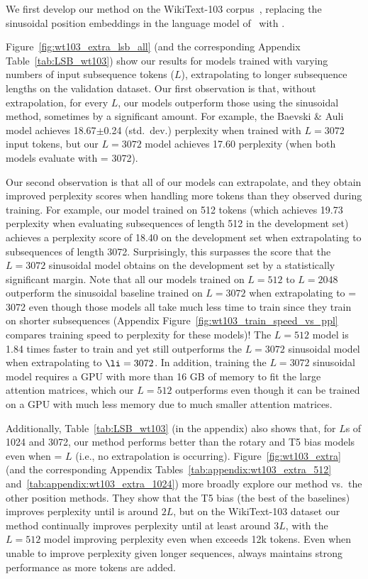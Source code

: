 We first develop our method on the WikiText-103 corpus~\citep{pointer}, replacing the sinusoidal position embeddings in the language model of~\cite{baevski} with \al. 

Figure~\ref{fig:wt103_extra_lsb_all} (and the corresponding Appendix Table~\ref{tab:LSB_wt103}) show our results for models trained with varying numbers of input subsequence tokens ($L$), extrapolating to longer subsequence lengths on the validation dataset. 
Our first observation is that, without extrapolation, for every $L$, our models outperform  those using the sinusoidal method, sometimes by a  significant %
amount. For example, the Baevski \& Auli model achieves 18.67$\pm$0.24 (std.~dev.) perplexity when trained with $L = 3072$ input tokens, but our $L=3072$ model achieves 17.60 perplexity (when both models evaluate with \li = 3072).

Our second observation is that all of our models can extrapolate, and they obtain improved perplexity scores when handling more tokens than they observed during training. For example, our model trained on 512 tokens (which achieves 19.73 perplexity when evaluating subsequences of length 512 in the development set) achieves a perplexity score of 18.40 on the development set when extrapolating to subsequences of length 3072. Surprisingly, this surpasses the score that the $L=3072$ sinusoidal model obtains on the development set by a statistically significant margin. 
Note that all our models trained on $L=512$ to $L=2048$ outperform the sinusoidal baseline trained on $L=3072$ when extrapolating to \li = 3072 even though those models all take much less time to train since they train on shorter subsequences (Appendix Figure~\ref{fig:wt103_train_speed_vs_ppl} compares training speed to perplexity for these models)! The $L=512$ model is 1.84 times faster to train and yet still outperforms the $L=3072$ sinusoidal model when extrapolating to $\li = 3072$. In addition, training the $L=3072$ sinusoidal model requires a GPU with more than 16 GB of memory to fit the large attention matrices, which our $L=512$ outperforms even though it can be trained on a GPU with much less memory due to much smaller attention matrices. 

Additionally,  Table~\ref{tab:LSB_wt103} (in the appendix) also shows that, for $L$s  of 1024 and 3072, our method performs better than the rotary and T5 bias models even when \li = $L$ (i.e., no extrapolation is occurring).
Figure~\ref{fig:wt103_extra} (and the corresponding Appendix Tables~\ref{tab:appendix:wt103_extra_512} and~\ref{tab:appendix:wt103_extra_1024}) more broadly explore our method vs.~the other position methods. They show that the T5 bias (the best of the baselines) improves perplexity until \li is around $2L$, but on the WikiText-103 dataset our method continually improves perplexity until at least around $3L$, with the $L=512$ model improving perplexity even when \li exceeds 12k tokens. Even when unable to improve perplexity given longer sequences, \al always maintains strong performance as more tokens are added. 

